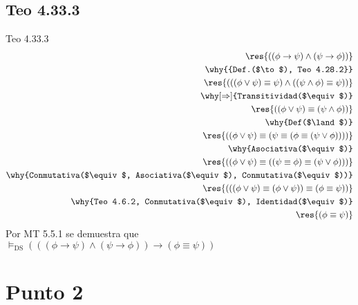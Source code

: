 \documentclass{article}
\begin{document}
\subsection{Teo 4.33.3}
\begin{logicenv}[5]{Teo 4.33.3}
    \begin{align*}
            \res{((\phi \to \psi) \land (\psi \to \phi))}\\
        \why{{Def.($\to$), Teo 4.28.2}}\\
            \res{(((\phi \lor \psi) \equiv \psi) \land ((\psi \land \phi) \equiv \psi))}\\
        \why[\Rightarrow]{Transitividad($\equiv$)}\\
            \res{((\phi \lor \psi) \equiv (\psi \land \phi))}\\
        \why{Def($\land$)}\\
            \res{((\phi \lor \psi) \equiv (\psi \equiv (\phi \equiv (\psi \lor \phi))))}\\
        \why{Asociativa($\equiv$)}\\
            \res{((\phi \lor \psi) \equiv ((\psi \equiv \phi) \equiv (\psi \lor \phi)))}\\
        \why{Conmutativa($\equiv$, Asociativa($\equiv$), Conmutativa($\equiv$))}\\
            \res{(((\phi \lor \psi) \equiv (\phi \lor \psi)) \equiv (\phi \equiv \psi))}\\
        \why{Teo 4.6.2, Conmutativa($\equiv$), Identidad($\equiv$)}\\
            \res{(\phi \equiv \psi)}
    \end{align*}
    Por MT 5.5.1 se demuestra que\\
    $\vDash_\text{DS} (((\phi \to \psi) \land (\psi \to \phi)) \to (\phi \equiv \psi))$
\end{logicenv}

\section{Punto 2}
\end{document}
